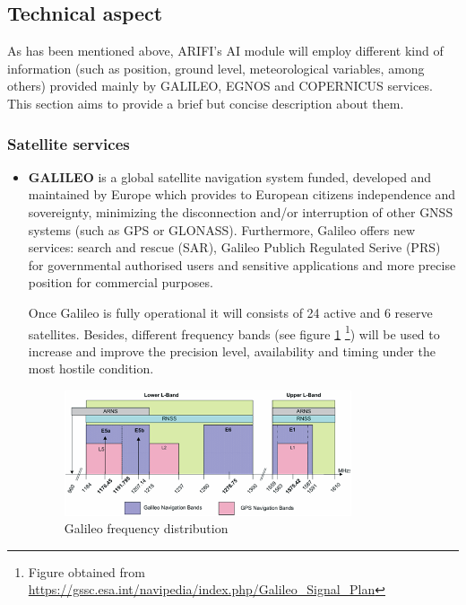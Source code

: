 
\newpage
\subsection{Technical aspect}

\color{blue} As has been mentioned above, ARIFI's AI module will employ different kind of information (such as position, ground level, meteorological variables, among others) provided mainly by GALILEO, EGNOS and COPERNICUS services. This section aims to provide a brief but concise description about them. 
\color{black} 

\subsubsection{Satellite services}
\begin{itemize}
    \item \textbf{GALILEO} \color{blue} is a global satellite navigation system funded, developed and maintained by Europe which provides to European citizens independence and sovereignty, minimizing the disconnection and/or interruption of other GNSS systems (such as GPS or GLONASS). Furthermore, Galileo offers new services: search and rescue (SAR), Galileo Publich Regulated Serive (PRS) for governmental authorised users and sensitive applications and more precise position for commercial purposes.   
    
    Once Galileo is fully operational it will consists of 24 active and 6 reserve satellites. Besides, different frequency bands (see figure \ref{fig:frequency_plan} \footnote{Figure obtained from \url{https://gssc.esa.int/navipedia/index.php/Galileo_Signal_Plan}}) will be used to increase and improve the precision level, availability and timing under the most hostile condition. 
    
    \begin{figure}
    	\centering
    	\includegraphics[width=0.8\textwidth]{images/Galileo_Frequency_Plan.png}
    	\caption{Galileo frequency distribution}
    	\label{fig:frequency_plan}
    \end{figure} 
    

\end{itemize}
